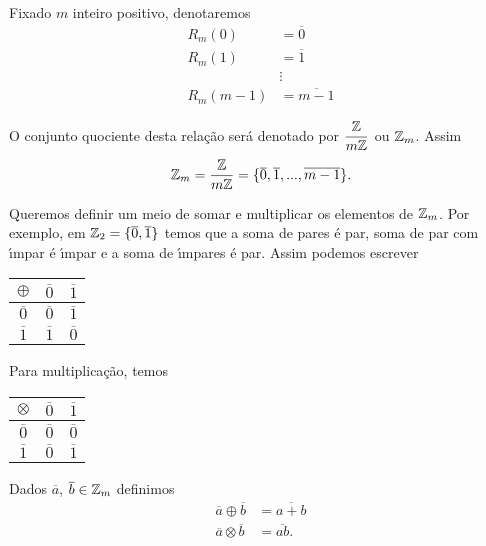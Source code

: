 \begin{observacao}
Fixado $m$ inteiro positivo, denotaremos
\begin{align*}
	R_{m}(0) &= \overline{0}\\
	R_{m}(1) &= \overline{1}\\
	&\vdots\\
	R_{m}(m-1) &= \overline{m-1}
\end{align*}

O conjunto quociente desta rela{\c c}{\~a}o ser{\'a} denotado por $\displaystyle\frac{\mathbb{Z}}{m\mathbb{Z}}$ ou $\mathbb{Z}_m$. Assim
\[
	\mathbb{Z}_m = \displaystyle\frac{\mathbb{Z}}{m\mathbb{Z}}=\{\overline{0},\overline{1},...,\overline{m-1}\}.
\]
\end{observacao}

Queremos definir um meio de somar e multiplicar os elementos de $\mathbb{Z}_m$. Por exemplo, em $\mathbb{Z}_2 = \{\overline{0},\overline{1}\}$ temos que a soma de pares {\'e} par, soma de par com {\'\i}mpar {\'e} {\'\i}mpar e a soma de {\'\i}mpares {\'e} par. Assim podemos escrever

\begin{table}[h]
   \centering 
   \setlength{\arrayrulewidth}{0,5\arrayrulewidth}
   \begin{tabular}{|c|c|c|} 
      \hline
      $\oplus$ & $\overline{0}$ & $\overline{1}$\\
      \hline
      $\overline{0}$ & $\overline{0}$ & $\overline{1}$ \\
      \hline
      $\overline{1}$ & $\overline{1}$ & $\overline{0}$ \\
      \hline
   \end{tabular}
\end{table}

Para multiplica{\c c}{\~a}o, temos

\begin{table}[h]
   \centering 
   \setlength{\arrayrulewidth}{0,5\arrayrulewidth}
   \begin{tabular}{|c|c|c|} 
      \hline
      $\otimes$ & $\overline{0}$ & $\overline{1}$\\
      \hline
      $\overline{0}$ & $\overline{0}$ & $\overline{0}$ \\
      \hline
      $\overline{1}$ & $\overline{0}$ & $\overline{1}$ \\
      \hline
   \end{tabular}
\end{table}

\begin{definicao}
	Dados $\overline{a}$, $\overline{b} \in \mathbb{Z}_m$ definimos
	\begin{align}
		\overline{a}\oplus\overline{b} &= \overline{a + b}\label{soma_modulo_m}\\
		\overline{a}\otimes\overline{b} &= \overline{ab}.\label{multiplicacao_modulo_m}
	\end{align}
\end{definicao}

